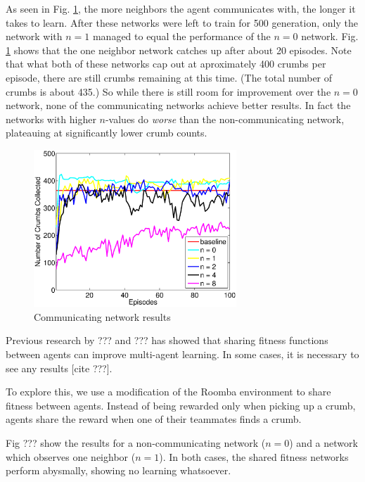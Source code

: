 \documentclass[conference]{IEEEtran}
\begin{document}
As seen in Fig. \ref{neroevolution:communication_results}, the more neighbors the agent communicates with, the longer it takes to learn. After these networks were left to train for 500 generation, only the network with $n=1$ managed to equal the performance of the $n=0$ network. Fig. \ref{neroevolution:communication_results} shows that the one neighbor network catches up after about 20 episodes. Note that what both of these networks cap out at aproximately 400 crumbs per episode, there are still crumbs remaining at this time. (The total number of crumbs is about 435.) So while there is still room for improvement over the $n=0$ network, none of the communicating networks achieve better results. In fact the networks with higher $n$-values do \textit{worse} than the non-communicating network, plateauing at significantly lower crumb counts.

\begin{figure}[t]
\centering
\includegraphics[width=3.0in]{./figures/neroevolution/comm_result.eps}
\caption{Communicating network results}
\label{neroevolution:communication_results}
\end{figure}

Previous research by ??? and ??? has showed that sharing fitness functions between agents can improve multi-agent learning. In some cases, it is necessary to see any results [cite ???].

To explore this, we use a modification of the Roomba environment to share fitness between agents. Instead of being rewarded only when picking up a crumb, agents share the reward when one of their teammates finds a crumb. 

Fig ??? show the results for a non-communicating network ($n=0$) and a network which observes one neighbor ($n=1$). In both cases, the shared fitness networks perform abysmally, showing no learning whatsoever.
\end{document}
